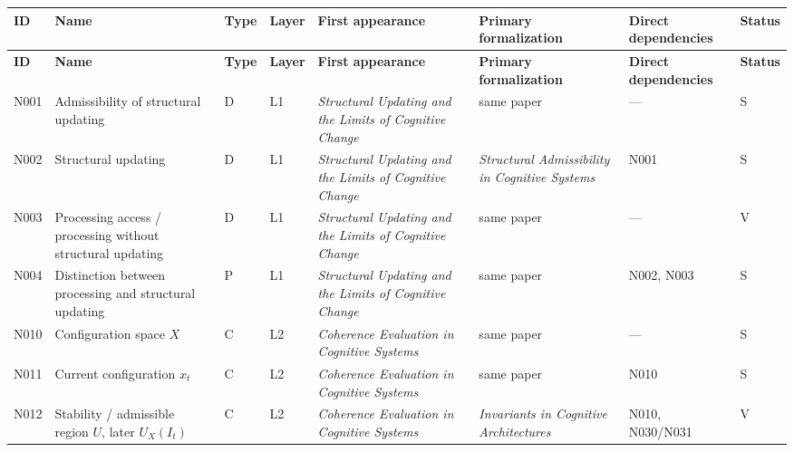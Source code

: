 \documentclass[11pt,a4paper]{article}
\begin{document}
	\begin{longtable}{>{\RaggedRight\arraybackslash}p{}
			>{\RaggedRight\arraybackslash}p{}
			>{\RaggedRight\arraybackslash}p{}
			>{\RaggedRight\arraybackslash}p{}
			>{\RaggedRight\arraybackslash}p{}
			>{\RaggedRight\arraybackslash}p{}
			>{\RaggedRight\arraybackslash}p{}
			>{\RaggedRight\arraybackslash}p{}}
		\toprule
		\textbf{ID} & \textbf{Name} & \textbf{Type} & \textbf{Layer} & \textbf{First appearance} & \textbf{Primary formalization} & \textbf{Direct dependencies} & \textbf{Status} \\
		\midrule
		\endfirsthead
		\toprule
		\textbf{ID} & \textbf{Name} & \textbf{Type} & \textbf{Layer} & \textbf{First appearance} & \textbf{Primary formalization} & \textbf{Direct dependencies} & \textbf{Status} \\
		\midrule
		\endhead
		
		N001 & Admissibility of structural updating & D & L1 & \emph{Structural Updating and the Limits of Cognitive Change} & same paper & --- & S \\
		
		N002 & Structural updating & D & L1 & \emph{Structural Updating and the Limits of Cognitive Change} & \emph{Structural Admissibility in Cognitive Systems} & N001 & S \\
		
		N003 & Processing access / processing without structural updating & D & L1 & \emph{Structural Updating and the Limits of Cognitive Change} & same paper & --- & V \\
		
		N004 & Distinction between processing and structural updating & P & L1 & \emph{Structural Updating and the Limits of Cognitive Change} & same paper & N002, N003 & S \\
		
		N010 & Configuration space $X$ & C & L2 & \emph{Coherence Evaluation in Cognitive Systems} & same paper & --- & S \\
		
		N011 & Current configuration $x_t$ & C & L2 & \emph{Coherence Evaluation in Cognitive Systems} & same paper & N010 & S \\
		
		N012 & Stability / admissible region $U$, later $U_X(I_t)$ & C & L2 & \emph{Coherence Evaluation in Cognitive Systems} & \emph{Invariants in Cognitive Architectures} & N010, N030/N031 & V \\
		

\end{longtable}
\end{document}
